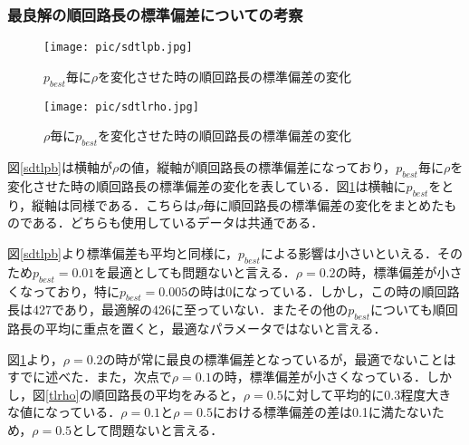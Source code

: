 \documentclass[a4j]{jsarticle}
\begin{document}
\subsubsection{最良解の順回路長の標準偏差についての考察}

\begin{figure}[htb]
 \begin{minipage}{0.5\hsize}
  \begin{center}
   \texttt{[image: pic/sdtlpb.jpg]}
  \end{center}
  \caption{$p_{best}$毎に$\rho$を変化させた時の順回路長の標準偏差の変化}
  \label{sdtlpb}
 \end{minipage}
 \begin{minipage}{0.5\hsize}
  \begin{center}
   \texttt{[image: pic/sdtlrho.jpg]}
  \end{center}
  \caption{$\rho$毎に$p_{best}$を変化させた時の順回路長の標準偏差の変化}
  \label{sdtlrho}
 \end{minipage}
\end{figure}

図\ref{sdtlpb}は横軸が$\rho$の値，縦軸が順回路長の標準偏差になっており，$p_{best}$毎に$\rho$を変化させた時の順回路長の標準偏差の変化を表している．図\ref{sdtlrho}は横軸に$p_{best}$をとり，縦軸は同様である．こちらは$\rho$毎に順回路長の標準偏差の変化をまとめたものである．どちらも使用しているデータは共通である．
\par
図\ref{sdtlpb}より標準偏差も平均と同様に，$p_{best}$による影響は小さいといえる．そのため$p_{best} = 0.01$を最適としても問題ないと言える．$\rho = 0.2$の時，標準偏差が小さくなっており，特に$p_{best} = 0.005$の時は0になっている．しかし，この時の順回路長は427であり，最適解の426に至っていない．またその他の$p_{best}$についても順回路長の平均に重点を置くと，最適なパラメータではないと言える．
\par
図\ref{sdtlrho}より，$\rho = 0.2$の時が常に最良の標準偏差となっているが，最適でないことはすでに述べた．また，次点で$\rho = 0.1$の時，標準偏差が小さくなっている．しかし，図\ref{tlrho}の順回路長の平均をみると，$\rho = 0.5$に対して平均的に0.3程度大きな値になっている．$\rho = 0.1$と$\rho = 0.5$における標準偏差の差は0.1に満たないため，$\rho = 0.5$として問題ないと言える．
\end{document}
